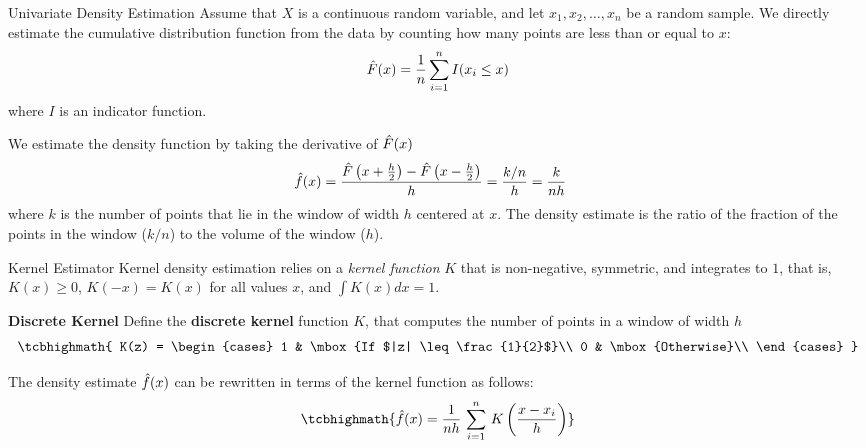 \begin{frame}{Univariate Density Estimation}
Assume that $X$ is a continuous random variable, and let $x_1, x_2,
\ldots, x_n$ be a random sample.
We directly estimate the cumulative distribution function
from the data by counting how many points are less than or equal
to $x$:
\begin{align*}
  \hat{F}(x)= {1\over n}  \sum_{i=1}^n I(x_i \leq x)
\end{align*}
where $I$ is an indicator function.

\medskip
We 
estimate the density function by taking the derivative of $\hat{F}(x)$
\begin{align*}
  \kern3pt\hat{\kern-3pt f}(x) & =
  \frac{\hat{F}\left(x+\frac{h}{2}\right)-\hat{F}\left(x-\frac{h}{2}\right)}{h}
  = {{k/n} \over h} = {k \over nh}
\end{align*}
where $k$
is the number of points
that lie in the window of width $h$ centered at $x$.
The density estimate is the ratio of the
fraction of the points in the window ($k/n$) to the volume of the window
($h$). 
\end{frame}


\begin{frame}{Kernel Estimator}
Kernel density estimation relies on a {\em kernel
function} $K$
that is non-negative, symmetric, and integrates to $1$,
that is, $K(x) \ge 0$, $K(-x) = K(x)$
for all values $x$, and
${\int K(x) dx = 1}$.

\medskip
{\bf Discrete Kernel}
Define the {\bf discrete kernel} function $K$, that
computes the number of points
in a window of width $h$
\begin{align*}
\tcbhighmath{
  K(z) = \begin{cases}
    1 & \mbox{If $|z| \leq \frac{1}{2}$}\\
    0 & \mbox{Otherwise}\\
  \end{cases}
}
\end{align*}

The density estimate $\kern3pt\hat{\kern-3pt f}(x)$ can
be rewritten in terms
of the kernel function as follows:
\begin{align*}
\tcbhighmath{
    \hf(x) =  \frac{1}{nh}\,\sum_{i=1}^n\,
    K \left(\frac{x-x_i}{h}\right)
}
\end{align*}
\end{frame}



